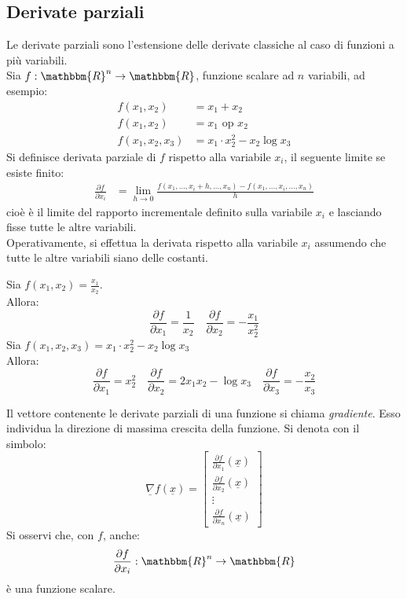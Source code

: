 \documentclass[12pt]{report}
\begin{document}
\subsection{Derivate parziali}
Le derivate parziali sono l'estensione delle derivate classiche al caso di funzioni a più variabili. \\
Sia $f: \mathbbm{R}^n \to \mathbbm{R}$, funzione scalare ad $n$ variabili, ad esempio:
\begin{align*}
	f(x_1, x_2) &= x_1 + x_2 \\
	f(x_1, x_2) &= x_1 \text{ op } x_2 \\
	f(x_1, x_2, x_3) &= x_1 \cdot x_2^2 - x_2 \log x_3
\end{align*}
Si definisce derivata parziale di $f$ rispetto alla variabile $x_i$, il seguente limite se esiste finito:
\begin{align*}
	\frac{\partial f}{\partial x_i} &= \lim\limits_{h \to 0}\frac{f(x_1, \dots, x_i + h, \dots, x_n)-f(x_1, \dots, x_i, \dots, x_n)}{h}
\end{align*}
cioè è il limite del rapporto incrementale definito sulla variabile $x_i$ e lasciando fisse tutte le altre variabili. \\
Operativamente, si effettua la derivata rispetto alla variabile $x_i$ assumendo che tutte le altre variabili siano delle costanti.
\begin{example}{}{}
Sia $f(x_1, x_2) = \frac{x_1}{x_2}$. \\
Allora:
\[
\frac{\partial f}{\partial x_1} = \frac{1}{x_2} \quad \frac{\partial f}{\partial x_2} = -\frac{x_1}{x_2^2}
\]
Sia $f(x_1, x_2, x_3) = x_1\cdot x_2^2 - x_2 \log x_3$ \\
Allora:
\[
\frac{\partial f}{\partial x_1} = x_2^2 \quad \frac{\partial f}{\partial x_2} = 2x_1x_2 - \log x_3 \quad \frac{\partial f}{\partial x_3} = -\frac{x_2}{x_3}
\]
\end{example}
Il vettore contenente le derivate parziali di una funzione si chiama \textit{gradiente}. Esso individua la direzione di massima crescita della funzione. Si denota con il simbolo:
\[
\underline{\nabla} f(\underline{x}) = \begin{bmatrix}\frac{\partial f}{\partial x_1}(\underline{x}) \\ \frac{\partial f}{\partial x_2}(\underline{x}) \\ \vdots \\ \frac{\partial f}{\partial x_n}(\underline{x}) \end{bmatrix}
\]
Si osservi che, con $f$, anche:
\[
\frac{\partial f}{\partial x_i}: \mathbbm{R}^n \to \mathbbm{R}
\]
è una funzione scalare.
\end{document}
